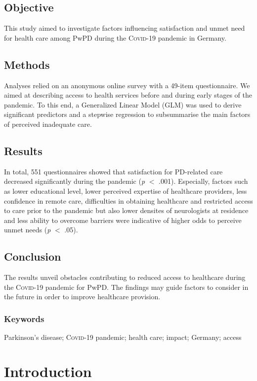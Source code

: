 \documentclass[a4paper,oneside,11pt,english]{scrartcl}
\begin{document}
\subsection*{Objective}
This study aimed to investigate factors influencing satisfaction and unmet need for health care among Pw\textsc{PD} during the \textsc{Covid}-19 pandemic in Germany.
\subsection*{Methods} 
Analyses relied on an anonymous online survey with a 49-item questionnaire. We aimed at describing access to health services before and during early stages of the pandemic. To this end, a Generalized Linear Model (GLM) was used to derive significant predictors and a stepwise regression to subsummarise the main factors of perceived inadequate care.  
\subsection*{Results}
In total, 551 questionnaires showed that satisfaction for \textsc{PD}-related care decreased significantly during the pandemic (\textit{p} $<$ .001). Especially, factors such as lower educational level, lower perceived expertise of healthcare providers, less confidence in remote care, difficulties in obtaining healthcare and restricted access to care prior to the pandemic but also lower densites of neurologists at residence and less ability to overcome barriers were indicative of higher odds to perceive unmet needs (\textit{p} $<$ .05).
\subsection*{Conclusion}
The results unveil obstacles contributing to reduced access to healthcare during the \textsc{Covid}-19 pandemic for PwPD. The findings may guide factors to consider in the future in order to improve healthcare provision.
\subsubsection*{Keywords}
\small{Parkinson's disease; \textsc{Covid}-19 pandemic; health care; impact; Germany; access}

\newpage

\section*{Introduction}
\end{document}
